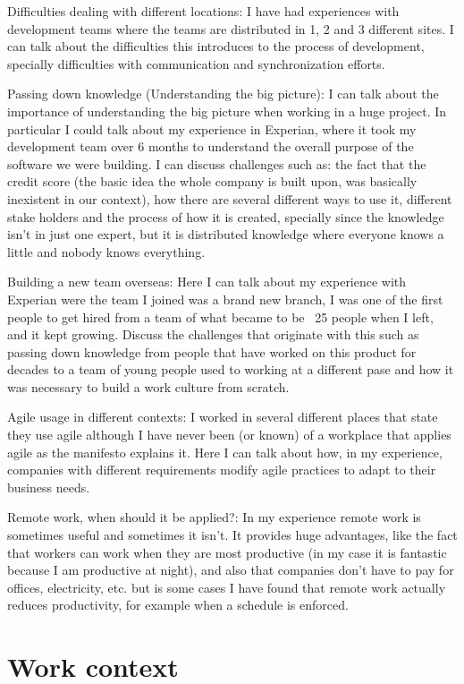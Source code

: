 \documentclass[12pt, letterpaper, twoside]{article}
\begin{document}
Difficulties dealing with different locations: I have had experiences with development teams where the teams are distributed in 1, 2 and 3 different sites. I can talk about the difficulties this introduces to the process of development, specially difficulties with communication and synchronization efforts.

Passing down knowledge (Understanding the big picture): I can talk about the importance of understanding the big picture when working in a huge project. In particular I could talk about my experience in Experian, where it took my development team over 6 months to understand the overall purpose of the software we were building. I can discuss challenges such as: the fact that the credit score (the basic idea the whole company is built upon, was basically inexistent in our context), how there are several different ways to use it, different stake holders and the process of how it is created, specially since the knowledge isn't in just one expert, but it is distributed knowledge where everyone knows a little and nobody knows everything.

Building a new team overseas: Here I can talk about my experience with Experian were the team I joined was a brand new branch, I was one of the first people to get hired from a team of what became to be ~25 people when I left, and it kept growing. Discuss the challenges that originate with this such as passing down knowledge from people that have worked on this product for decades to a team of young people used to working at a different pase and how it was necessary to build a work culture from scratch.

Agile usage in different contexts: I worked in several different places that state they use agile although I have never been (or known) of a  workplace that applies agile as the manifesto explains it. Here I can talk about how, in my experience, companies with different requirements modify agile practices to adapt to their business needs.

Remote work, when should it be applied?: In my experience remote work is sometimes useful and sometimes it isn't. It provides huge advantages, like the fact that workers can work when they are most productive (in my case it is fantastic because I am productive at night), and also that companies don't have to pay for offices, electricity, etc. but is some cases I have found that remote work actually reduces productivity, for example when a schedule is enforced.

 
\section{Work context}
\end{document}
